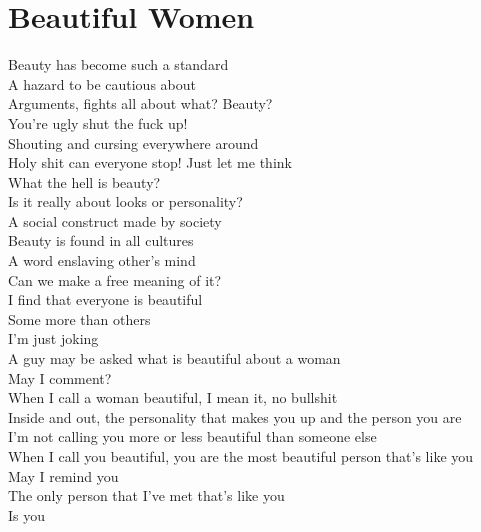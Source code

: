 \documentclass[12pt, b5paper]{article}
\begin{document}
\newpage 
\section{Beautiful Women}
Beauty has become such a standard 
\\A hazard to be cautious about
\\Arguments, fights all about what? Beauty?
\\You're ugly shut the fuck up!
\\Shouting and cursing everywhere around
\\Holy shit can everyone stop! Just let me think
\\What the hell is beauty? 
\\Is it really about looks or personality? 
\\A social construct made by society 
\\Beauty is found in all cultures
\\A word enslaving other’s mind 
\\Can we make a free meaning of it? 
\\I find that everyone is beautiful 
\\Some more than others 
\\I'm just joking 
\\A guy may be asked what is beautiful about a woman
\\May I comment? 
\\When I call a woman beautiful, I mean it, no bullshit 
\\Inside and out, the personality that makes you up and the person you are 
\\I’m not calling you more or less beautiful than someone else 
\\When I call you beautiful, you are the most beautiful person that’s like you
\\May I remind you
\\The only person that I’ve met that’s like you
\\Is you

\newpage 
\end{document}
